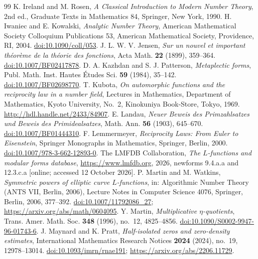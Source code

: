 \documentclass[11pt]{article}
\numberwithin{equation}{section}
\begin{document}
\begin{thebibliography}{99}
 K. Ireland and M. Rosen, \emph{A Classical Introduction to Modern Number Theory},
 2nd ed., Graduate Texts in Mathematics 84, Springer, New York, 1990.
 H. Iwaniec and E. Kowalski, \emph{Analytic Number Theory},
 American Mathematical Society Colloquium Publications 53, American Mathematical Society,
 Providence, RI, 2004. \href{https://doi.org/10.1090/coll/053}{doi:10.1090/coll/053}.
 J. L. W. V. Jensen, \emph{Sur un nouvel et important th\'eor\`eme de la th\'eorie des
 fonctions}, Acta Math. \textbf{22} (1899), 359--364.
 \href{https://doi.org/10.1007/BF02417878}{doi:10.1007/BF02417878}.
 D. A. Kazhdan and S. J. Patterson, \emph{Metaplectic forms},
 Publ. Math. Inst. Hautes \'Etudes Sci. \textbf{59} (1984), 35--142.
 \href{https://doi.org/10.1007/BF02698770}{doi:10.1007/BF02698770}.
 T. Kubota, \emph{On automorphic functions and the reciprocity law in a number field},
 Lectures in Mathematics, Department of Mathematics, Kyoto University, No.~2,
 Kinokuniya Book-Store, Tokyo, 1969. \url{http://hdl.handle.net/2433/84907}.
 E. Landau, \emph{Neuer Beweis des Primzahlsatzes und Beweis des Primidealsatzes},
 Math. Ann. \textbf{56} (1903), 645--670.
 \href{https://doi.org/10.1007/BF01444310}{doi:10.1007/BF01444310}.
 F. Lemmermeyer, \emph{Reciprocity Laws: From Euler to Eisenstein},
 Springer Monographs in Mathematics, Springer, Berlin, 2000.
 \href{https://doi.org/10.1007/978-3-662-12893-0}{doi:10.1007/978-3-662-12893-0}.
 The LMFDB Collaboration, \emph{The $L$-functions and modular forms database},
 \url{https://www.lmfdb.org}, 2026, newforms 9.4.a.a and 12.3.c.a [online; accessed 12 October 2026].
 P. Martin and M. Watkins, \emph{Symmetric powers of elliptic curve $L$-functions},
 in: Algorithmic Number Theory (ANTS VII, Berlin, 2006), Lecture Notes in Computer Science 4076,
 Springer, Berlin, 2006, 377--392.
 \href{https://doi.org/10.1007/11792086_27}{doi:10.1007/11792086\_27};
 \url{https://arxiv.org/abs/math/0604095}.
 Y. Martin, \emph{Multiplicative $\eta$-quotients},
 Trans. Amer. Math. Soc. \textbf{348} (1996), no.~12, 4825--4856.
 \href{https://doi.org/10.1090/S0002-9947-96-01743-6}{doi:10.1090/S0002-9947-96-01743-6}.
 J. Maynard and K. Pratt, \emph{Half-isolated zeros and zero-density estimates},
 International Mathematics Research Notices \textbf{2024} (2024), no.~19, 12978--13014.
 \href{https://doi.org/10.1093/imrn/rnae191}{doi:10.1093/imrn/rnae191};
 \url{https://arxiv.org/abs/2206.11729}.

\end{thebibliography}
\end{document}
